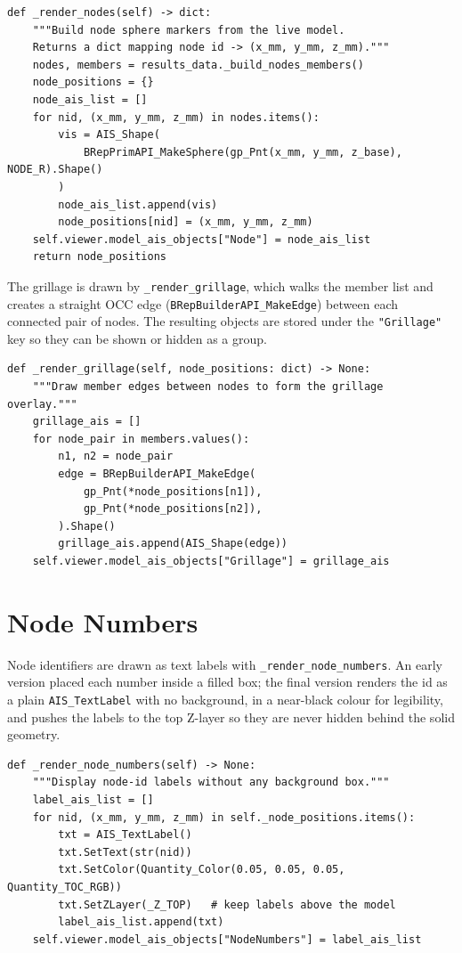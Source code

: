 \begin{lstlisting}[caption={Node sphere markers, built from the live model (\texttt{cad\_3d.py}).},label={lst:rendernodes}]
def _render_nodes(self) -> dict:
    """Build node sphere markers from the live model.
    Returns a dict mapping node id -> (x_mm, y_mm, z_mm)."""
    nodes, members = results_data._build_nodes_members()
    node_positions = {}
    node_ais_list = []
    for nid, (x_mm, y_mm, z_mm) in nodes.items():
        vis = AIS_Shape(
            BRepPrimAPI_MakeSphere(gp_Pnt(x_mm, y_mm, z_base), NODE_R).Shape()
        )
        node_ais_list.append(vis)
        node_positions[nid] = (x_mm, y_mm, z_mm)
    self.viewer.model_ais_objects["Node"] = node_ais_list
    return node_positions
\end{lstlisting}

The grillage is drawn by \texttt{\_render\_grillage}, which walks the member list and creates a
straight OCC edge (\texttt{BRepBuilderAPI\_MakeEdge}) between each connected pair of nodes. The
resulting objects are stored under the \texttt{"Grillage"} key so they can be shown or hidden
as a group.

\begin{lstlisting}[caption={Grillage overlay: one edge per member (\texttt{cad\_3d.py}).},label={lst:grillage}]
def _render_grillage(self, node_positions: dict) -> None:
    """Draw member edges between nodes to form the grillage overlay."""
    grillage_ais = []
    for node_pair in members.values():
        n1, n2 = node_pair
        edge = BRepBuilderAPI_MakeEdge(
            gp_Pnt(*node_positions[n1]),
            gp_Pnt(*node_positions[n2]),
        ).Shape()
        grillage_ais.append(AIS_Shape(edge))
    self.viewer.model_ais_objects["Grillage"] = grillage_ais
\end{lstlisting}

\section{Node Numbers}
Node identifiers are drawn as text labels with \texttt{\_render\_node\_numbers}. An early
version placed each number inside a filled box; the final version renders the id as a plain
\texttt{AIS\_TextLabel} with no background, in a near-black colour for legibility, and pushes
the labels to the top Z-layer so they are never hidden behind the solid geometry.

\begin{lstlisting}[caption={Node-id labels without a background box (\texttt{cad\_3d.py}).},label={lst:nodenumbers}]
def _render_node_numbers(self) -> None:
    """Display node-id labels without any background box."""
    label_ais_list = []
    for nid, (x_mm, y_mm, z_mm) in self._node_positions.items():
        txt = AIS_TextLabel()
        txt.SetText(str(nid))
        txt.SetColor(Quantity_Color(0.05, 0.05, 0.05, Quantity_TOC_RGB))
        txt.SetZLayer(_Z_TOP)   # keep labels above the model
        label_ais_list.append(txt)
    self.viewer.model_ais_objects["NodeNumbers"] = label_ais_list
\end{lstlisting}

